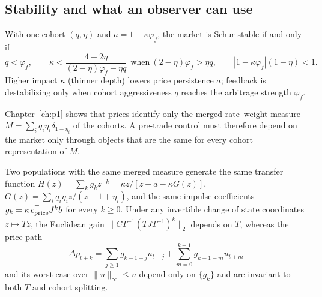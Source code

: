     \subsection{Stability and what an observer can use}
\begin{proposition}\label{p2:prop:jury}
With one cohort $(q,\eta)$ and $a=1-\kappa\varphi_f$, the market is Schur stable if and only if
\begin{equation}\label{p2:eq:jury}
q<\varphi_f,\qquad \kappa<\frac{4-2\eta}{(2-\eta)\varphi_f-\eta q}\ \ \text{when}\ (2-\eta)\varphi_f>\eta q,\qquad |1-\kappa\varphi_f|(1-\eta)<1 .
\end{equation}
Higher impact $\kappa$ (thinner depth) lowers price persistence $a$; feedback is destabilizing only when cohort aggressiveness $q$ reaches the arbitrage strength $\varphi_f$.
\end{proposition}
Chapter~\ref{ch:p1} shows that prices identify only the merged rate--weight measure $M=\sum_iq_i\eta_i\delta_{1-\eta_i}$ of the cohorts. A pre-trade control must therefore depend on the market only through objects that are the same for every cohort representation of $M$.

\begin{proposition}\label{p2:prop:invariance}
Two populations with the same merged measure generate the same transfer function $H(z)=\sum_kg_kz^{-k}=\kappa z/[z-a-\kappa G(z)]$, $G(z)=\sum_iq_i\eta_iz/(z-1+\eta_i)$, and the same impulse coefficients $g_k=\kappa\,c_{\rm price}^\top J^kb$ for every $k\ge0$. Under any invertible change of state coordinates $z\mapsto Tz$, the Euclidean gain $\|CT^{-1}(TJT^{-1})^k\|_2$ depends on $T$, whereas the price path
\[
\Delta p_{t+k}=\sum_{j\ge1}g_{k-1+j}u_{t-j}+\sum_{m=0}^{k-1}g_{k-1-m}u_{t+m}
\]
and its worst case over $\|u\|_\infty\le\bar u$ depend only on $\{g_k\}$ and are invariant to both $T$ and cohort splitting.
\end{proposition}

